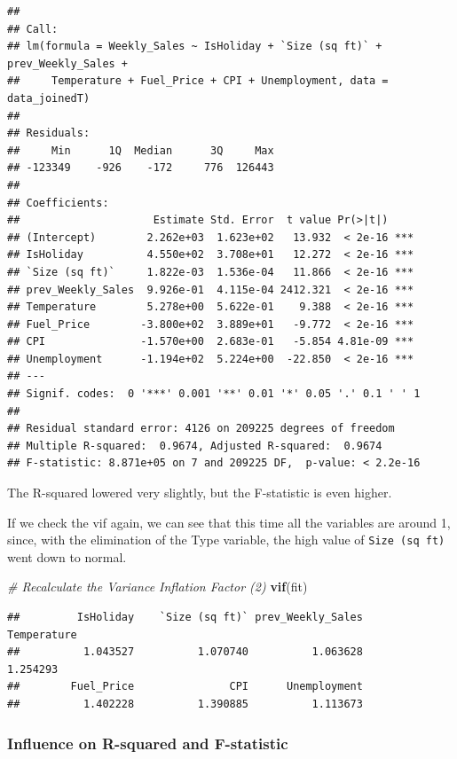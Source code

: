 \documentclass[11pt,]{article}
\newenvironment{Shaded}{\begin{snugshade}}{\end{snugshade}}
\newcommand{\KeywordTok}[1]{\textcolor[rgb]{0.13,0.29,0.53}{\textbf{{#1}}}}
\newcommand{\CommentTok}[1]{\textcolor[rgb]{0.56,0.35,0.01}{\textit{{#1}}}}
\newcommand{\NormalTok}[1]{{#1}}
\begin{document}
\begin{verbatim}
## 
## Call:
## lm(formula = Weekly_Sales ~ IsHoliday + `Size (sq ft)` + prev_Weekly_Sales + 
##     Temperature + Fuel_Price + CPI + Unemployment, data = data_joinedT)
## 
## Residuals:
##     Min      1Q  Median      3Q     Max 
## -123349    -926    -172     776  126443 
## 
## Coefficients:
##                     Estimate Std. Error  t value Pr(>|t|)    
## (Intercept)        2.262e+03  1.623e+02   13.932  < 2e-16 ***
## IsHoliday          4.550e+02  3.708e+01   12.272  < 2e-16 ***
## `Size (sq ft)`     1.822e-03  1.536e-04   11.866  < 2e-16 ***
## prev_Weekly_Sales  9.926e-01  4.115e-04 2412.321  < 2e-16 ***
## Temperature        5.278e+00  5.622e-01    9.388  < 2e-16 ***
## Fuel_Price        -3.800e+02  3.889e+01   -9.772  < 2e-16 ***
## CPI               -1.570e+00  2.683e-01   -5.854 4.81e-09 ***
## Unemployment      -1.194e+02  5.224e+00  -22.850  < 2e-16 ***
## ---
## Signif. codes:  0 '***' 0.001 '**' 0.01 '*' 0.05 '.' 0.1 ' ' 1
## 
## Residual standard error: 4126 on 209225 degrees of freedom
## Multiple R-squared:  0.9674, Adjusted R-squared:  0.9674 
## F-statistic: 8.871e+05 on 7 and 209225 DF,  p-value: < 2.2e-16
\end{verbatim}

The R-squared lowered very slightly, but the F-statistic is even higher.

If we check the vif again, we can see that this time all the variables
are around 1, since, with the elimination of the Type variable, the high
value of \texttt{Size\ (sq\ ft)} went down to normal.

\begin{Shaded}
\begin{Highlighting}[]
\CommentTok{# Recalculate the Variance Inflation Factor (2)}
\KeywordTok{vif}\NormalTok{(fit)}
\end{Highlighting}
\end{Shaded}

\begin{verbatim}
##         IsHoliday    `Size (sq ft)` prev_Weekly_Sales       Temperature 
##          1.043527          1.070740          1.063628          1.254293 
##        Fuel_Price               CPI      Unemployment 
##          1.402228          1.390885          1.113673
\end{verbatim}

\subsubsection{Influence on R-squared and
F-statistic}\label{influence-on-r-squared-and-f-statistic}
\end{document}
